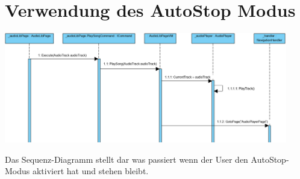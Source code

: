 \documentclass[../entwurf.tex]{subfiles}
\begin{document}
\section{Verwendung des AutoStop Modus}
\begin{center}
	\includegraphics[page=1,width=350pt,keepaspectratio]{../graphics/sequenz_diagramme/PlaySongSequenzDia.png}
\end{center}
Das Sequenz-Diagramm stellt dar was passiert wenn der User den AutoStop-Modus aktiviert hat und stehen bleibt.
\end{document}
